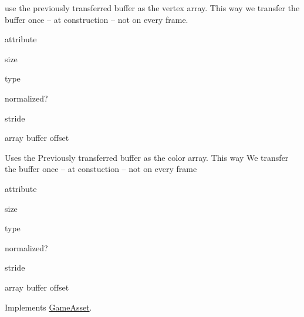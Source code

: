 use the previously transferred buffer as the vertex array. This way we transfer the buffer once -- at construction -- not on every frame.

attribute

size

type

normalized?

stride

array buffer offset

Uses the Previously transferred buffer as the color array. This way We transfer the buffer once -- at constuction -- not on every frame

attribute

size

type

normalized?

stride

array buffer offset 

Implements \hyperlink{classGameAsset_a961aa51ca0a9961fc584c0b5d5431300}{Game\+Asset}.


